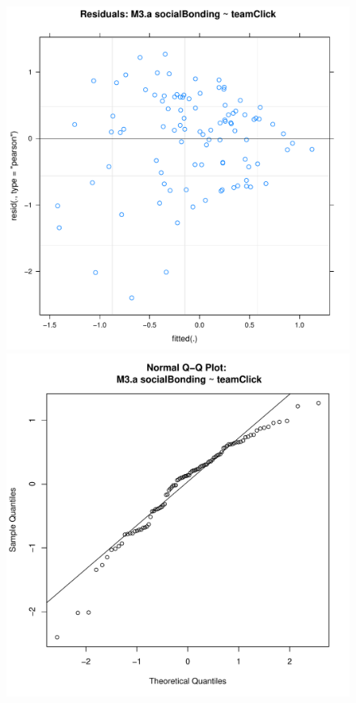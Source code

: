 \begin{figure}[htbp]
        \includegraphics[scale =.4]{images/MLM3aScatter.pdf}
        \includegraphics[scale =.4]{images/MLM3aQQNorm.pdf}

\end{figure}
